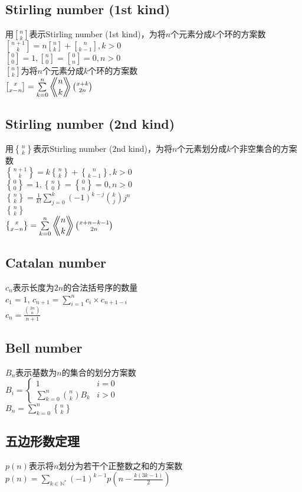 	\subsection*{Stirling number (1st kind)}
		用$ {n \brack k} $表示Stirling number (1st kind)，为将$ n $个元素分成$ k $个环的方案数
		\\$ {n + 1 \brack k} = n {n \brack k} + {n \brack k - 1}, k > 0 $
		\\$ {0 \brack 0} = 1, {n \brack 0} = {0 \brack n} = 0, n > 0 $
		\\$ {n \brack k} $为将$ n $个元素分成$ k $个环的方案数
		\\$ {x \brack x - n} = \sum\limits_{k = 0}^{n} \Eularian{n}{k} \binom{x + k}{2 n} $
	\subsection*{Stirling number (2nd kind)}
		用$ {n \brace k} $表示Stirling number (2nd kind)，为将$ n $个元素划分成$ k $个非空集合的方案数
		\\$ {n + 1 \brace k} = k {n \brace k} + {n \brace k - 1}, k > 0 $
		\\$ {0 \brace 0} = 1, {n \brace 0} = {0 \brace n} = 0, n > 0 $
		\\$ {n \brace k} = \frac{1}{k!} \sum\limits_{j = 0}^{k} (-1) ^ {k - j} \binom{k}{j} j^n $
		\\$ {n \brace k} $
		\\$ {x \brace x - n} = \sum\limits_{k = 0}^{n} \Eularian{n}{k} \binom{x + n - k - 1}{2 n} $
	\subsection*{Catalan number}
		$ c_n $表示长度为$ 2n $的合法括号序的数量
		\\$ c_1 = 1 $, $ c_{n+1} = \sum\limits_{i=1}^{n} c_i \times c_{n + 1 - i} $
		\\$ c_n = \frac{\binom{2n}{n}}{n + 1} $
	\subsection*{Bell number}
		$ B_n $表示基数为$ n $的集合的划分方案数
		\\$ B_i = \begin{cases}
			1 & i = 0\\
			\sum\limits_{k = 0}^{n} \binom{n}{k} B_k & i > 0
		\end{cases} $
		\\$ B_n = \sum\limits_{k = 0}^{n} {n \brace k} $
	\subsection*{五边形数定理}
		$ p(n) $表示将$ n $划分为若干个正整数之和的方案数
		\\$ p(n) = \sum\limits_{k \in \mathbb{N}^\ast} (-1)^{k - 1} p(n - \frac{k(3k - 1)}{2}) $
